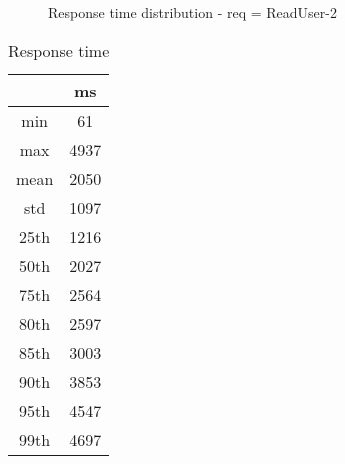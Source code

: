 \begin{minipage}{0.75\linewidth}
\begin{figure}[h]
\begin{adjustbox}{max width=1.0\linewidth, keepaspectratio}
  \end{adjustbox}
  \caption{Response time distribution - req = ReadUser-2}
\end{figure}
\end{minipage}\hfill\begin{minipage}{0.18\linewidth}
\begin{table}[h]
\begin{tabular}{|cc|}
\hline
\textbf{} & \textbf{ms}\\ \hline
 \Xhline{0.005\arrayrulewidth}
min & 61\\
 \Xhline{0.005\arrayrulewidth}
max & 4937\\
 \Xhline{0.005\arrayrulewidth}
mean & 2050\\
 \Xhline{0.005\arrayrulewidth}
std & 1097\\
\hline
\hline
 \Xhline{0.005\arrayrulewidth}
25th & 1216\\
 \Xhline{0.005\arrayrulewidth}
50th & 2027\\
 \Xhline{0.005\arrayrulewidth}
75th & 2564\\
 \Xhline{0.005\arrayrulewidth}
80th & 2597\\
 \Xhline{0.005\arrayrulewidth}
85th & 3003\\
 \Xhline{0.005\arrayrulewidth}
90th & 3853\\
 \Xhline{0.005\arrayrulewidth}
95th & 4547\\
 \Xhline{0.005\arrayrulewidth}
99th & 4697\\
\hline
\end{tabular}
\caption{Response time}
\end{table}
\end{minipage}\hfill